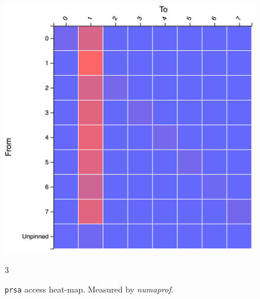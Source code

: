 \documentclass{paper}\usepackage{graphicx}
\begin{document}
\begin{figure}[!htb]
\begin{multicols}{3}
    \caption{\lstinline{prsa} access heat-map. Measured by \textit{numaprof}.}
    \label{fig:prsa_access}
    \includegraphics[width=\linewidth]{Paper/images/prsa/prsa_access.png}\par
    \end{multicols}{3}
\end{figure}


\end{document}
